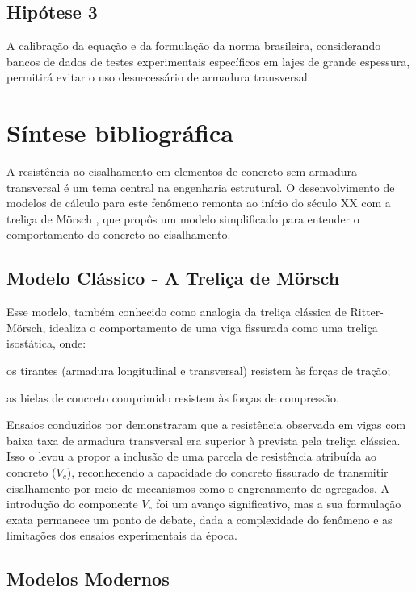 \section{Hipótese 3}
A calibração da equação e da formulação da norma brasileira, considerando bancos de dados de testes experimentais específicos em lajes de grande espessura, permitirá evitar o uso desnecessário de armadura transversal.

\chapter{Síntese bibliográfica}
A resistência ao cisalhamento em elementos de concreto sem armadura transversal é um tema central na engenharia estrutural. O desenvolvimento de modelos de cálculo para este fenômeno remonta ao início do século XX com a treliça de Mörsch \cite{Morsch1909}, que propôs um modelo simplificado para entender o comportamento do concreto ao cisalhamento.

\section{Modelo Clássico - A Treliça de Mörsch}
Esse modelo, também conhecido como analogia da treliça clássica de Ritter-Mörsch, idealiza o comportamento de uma viga fissurada como uma treliça isostática, onde:

\begin{alineas}
    \item os tirantes (armadura longitudinal e transversal) resistem às forças de tração;
    \item as bielas de concreto comprimido resistem às forças de compressão.
\end{alineas}

Ensaios conduzidos por \textcite{Leonhardt1964} demonstraram que a resistência observada em vigas com baixa taxa de armadura transversal era superior à prevista pela treliça clássica. Isso o levou a propor a inclusão de uma parcela de resistência atribuída ao concreto ($V_c$), reconhecendo a capacidade do concreto fissurado de transmitir cisalhamento por meio de mecanismos como o engrenamento de agregados. A introdução do componente $V_c$ foi um avanço significativo, mas a sua formulação exata permanece um ponto de debate, dada a complexidade do fenômeno e as limitações dos ensaios experimentais da época.


\section{Modelos Modernos}

